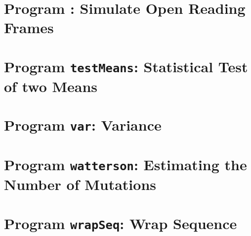 \documentclass[a4paper]{report}
\begin{document}
\chapter{Program : Simulate Open Reading
  Frames}\label{ch:so}

\chapter{Program \texttt{testMeans}: Statistical Test of two Means}\label{ch:tm}

\chapter{Program \texttt{var}: Variance}\label{ch:var}

\chapter{Program \texttt{watterson}: Estimating the Number of Mutations}\label{ch:wat}

\chapter{Program \texttt{wrapSeq}: Wrap Sequence}\label{ch:wra}



\end{document}
